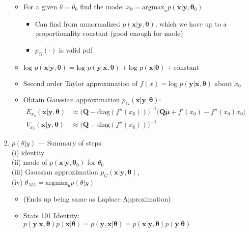 \documentclass{article}
\begin{document}
\begin{enumerate}
\citep{Lindstrom2014}
      \begin{itemize}
      \item For a given $\theta = \theta_{0}$ find the mode: $x_{0} = \text{argmax}_{x}p(\pmb{x}|\pmb{y},\pmb{\theta}_{0})$
                \begin{itemize}
                \item Can find from unnormalized $p(\pmb{x} | \pmb{y}, \pmb{\theta})$, which we have up to a proportionality constant (good enough for mode)
                \item $p_{G}(\cdot)$ is valid pdf
                \end{itemize}
      \item $\text{log } p(\pmb{x} | \pmb{y}, \pmb{\theta}) = \text{log } p(\pmb{y} | \pmb{x}, \pmb{\theta}) + \text{log } p(\pmb{x} | \pmb{\theta}) + \text{constant}$
      \item Second order Taylor approximation of $f(x) = \text{log } p(\pmb{y} | \pmb{x}, \pmb{\theta})$ about $x_{0}$
      \item Obtain Gaussian approximation $p_{G}(\pmb{x} | \pmb{y}, \pmb{\theta})$:
            \begin{align}
            E_{x_{0}}(\pmb{x|y,\theta}) & \approx \big( \pmb{Q} - \text{diag}(f''(x_{0})) \big)^{-1} \big( \pmb{Q\mu} + f'(x_{0}) - f''(x_{0})x_{0} \big)  \\
            V_{x_{0}}(\pmb{x|y,\theta}) & \approx \big( \pmb{Q} - \text{diag}(f''(x_{0})) \big)^{-1} 
            \end{align}
      \end{itemize}
  
\item $p(\theta|y)$ --- Summary of steps: \\ 

(i) identity \\ 
(ii) mode of $p(\pmb{x}|\pmb{y},\pmb{\theta}_{0})$ for $\theta_{0}$ \\
(iii) Gaussian approximation $p_{G}(\pmb{x} | \pmb{y}, \pmb{\theta})$, \\ 
(iv) $\theta_{ML} = \text{argmax}_{\theta} p(\theta|y)$

      \begin{itemize}
      \item (Ends up being same as \cite{Tierney1986} Laplace Approximation)
      \item Stats 101 Identity: $p(\pmb{y} | \pmb{x}, \pmb{\theta}) p(\pmb{x} | \pmb{\theta}) =
p(\pmb{y} , \pmb{x} | \pmb{\theta}) = p(\pmb{x} | \pmb{y}, \pmb{\theta}) p(\pmb{y} | \pmb{\theta})$


\end{itemize}
\end{enumerate}
\end{document}
